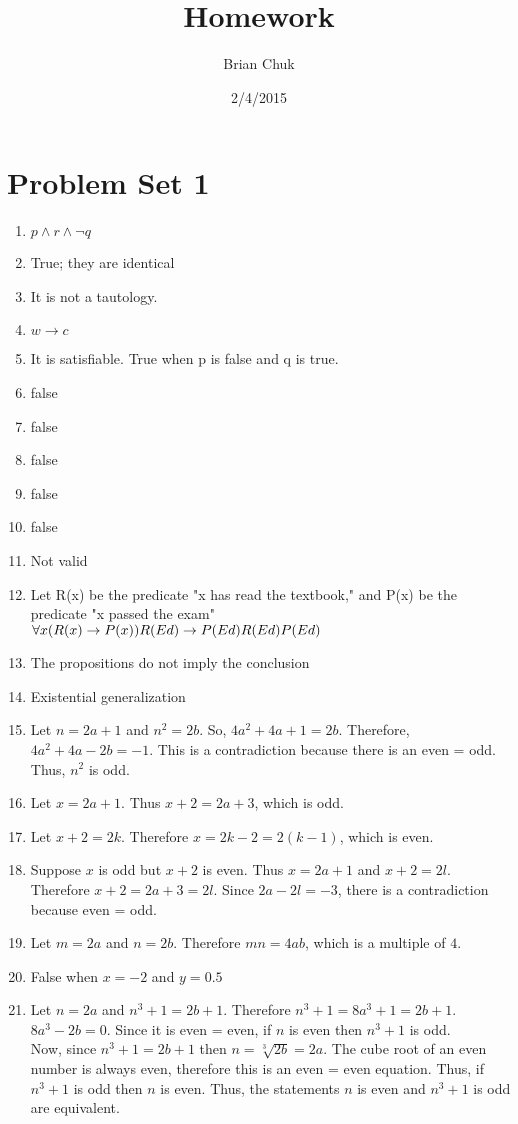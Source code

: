 \documentclass[11pt]{article}
\title{\textbf{Homework}}
\author{Brian Chuk}
\date{2/4/2015}
\begin{document}
\maketitle

\section{Problem Set 1}
\begin{enumerate}

\item $ p \wedge r \wedge \lnot q $
\item True; they are identical
\item It is not a tautology.
\item $ w \rightarrow  c $
\item It is satisfiable. True when p is false and q is true.
\item false 
\item false
\item false
\item false
\item false
\item Not valid
\item Let R(x) be the predicate "x has read the textbook," and P(x) be the predicate "x passed the exam"\\
$ \forall x (R(x) \rightarrow P(x)) \\ R(Ed) \rightarrow P(Ed) \\ R(Ed) \\ P(Ed)$ 
\item The propositions do not imply the conclusion
\item Existential generalization
\item Let $n = 2a + 1$ and $n^2 = 2b$. So, $4a^2 + 4a + 1 = 2b$. Therefore, $4a^2 + 4a - 2b = -1$. This is a contradiction because there is an even = odd. Thus, $n^2$ is odd.
\item Let $x = 2a + 1$. Thus $x + 2 = 2a + 3$, which is odd. 
\item Let $x + 2 = 2k$. Therefore $x = 2k - 2 = 2(k-1)$, which is even.
\item Suppose $x$ is odd but $x + 2$ is even. Thus $x = 2a + 1$ and $x + 2 = 2l$. Therefore $x + 2 = 2a + 3 = 2l$. Since $2a - 2l = -3$, there is a contradiction because even = odd.
\item Let $m = 2a$ and $n = 2b$. Therefore $mn = 4ab$, which is a multiple of $4$.
\item False when $x = -2$ and $y = 0.5$
\item Let $n = 2a$ and $n^3 + 1 = 2b + 1$. Therefore $n^3 + 1= 8a^3 + 1 = 2b + 1$. $8a^3 - 2b = 0$. Since it is even = even, if $n$ is even then $n^3 + 1 $ is odd. \\
Now, since $n^3 + 1 = 2b + 1$ then $n = \sqrt[3]{2b} = 2a$. The cube root of an even number is always even, therefore this is an even = even equation. Thus, if $n^3 + 1$ is odd then $n$ is even. Thus, the statements $n$ is even and $n^3 + 1$ is odd are equivalent.


\end{enumerate}
\end{document}
